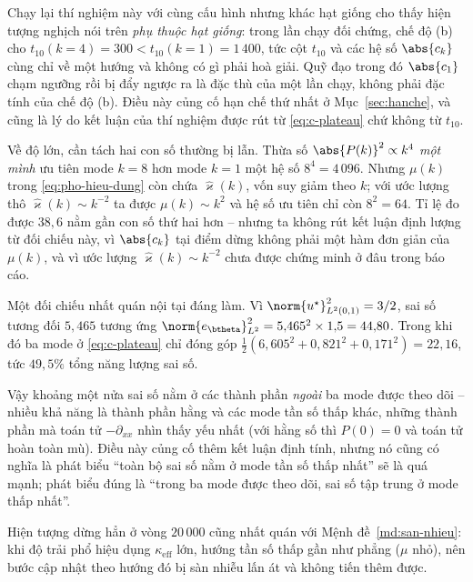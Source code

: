 Chạy lại thí nghiệm này với cùng cấu hình nhưng khác hạt giống cho thấy hiện
tượng nghịch nói trên \emph{phụ thuộc hạt giống}: trong lần chạy đối chứng,
chế độ (b) cho $t_{10}(k{=}4) = 300 < t_{10}(k{=}1) = 1\,400$, tức cột $t_{10}$
và các hệ số $\abs{c_k}$ cùng chỉ về một hướng và không có gì phải hoà giải.
Quỹ đạo trong đó $\abs{c_1}$ chạm ngưỡng rồi bị đẩy ngược ra là đặc thù của một
lần chạy, không phải đặc tính của chế độ (b). Điều này củng cố hạn chế thứ nhất
ở Mục~\ref{sec:hanche}, và cũng là lý do kết luận của thí nghiệm được rút từ
\eqref{eq:c-plateau} chứ không từ $t_{10}$.
 
Về độ lớn, cần tách hai con số thường bị lẫn. Thừa số $\abs{P(k)}^2 \propto k^4$
\emph{một mình} ưu tiên mode $k=8$ hơn mode $k=1$ một hệ số $8^4 = 4\,096$. Nhưng
$\mu(k)$ trong \eqref{eq:pho-hieu-dung} còn chứa $\widehat{\varkappa}(k)$, vốn suy
giảm theo $k$; với ước lượng thô $\widehat{\varkappa}(k)\sim k^{-2}$ ta được
$\mu(k) \sim k^{2}$ và hệ số ưu tiên chỉ còn $8^2 = 64$. Tỉ lệ đo được $38{,}6$
nằm gần con số thứ hai hơn -- nhưng ta không rút kết luận định lượng từ đối chiếu
này, vì $\abs{c_k}$ tại điểm dừng không phải một hàm đơn giản của $\mu(k)$, và vì
ước lượng $\widehat{\varkappa}(k)\sim k^{-2}$ chưa được chứng minh ở đâu trong
báo cáo.
 
\begin{nhanxet}
\label{nx:nang-luong}
Một đối chiếu nhất quán nội tại đáng làm. Vì
$\norm{u^{\star}}^2_{L^2(0,1)} = 3/2$, sai số tương đối $5{,}465$ tương ứng
$\norm{e_{\btheta}}^2_{L^2} = 5{,}465^2\times 1{,}5 = 44{,}80$. Trong khi đó ba
mode ở \eqref{eq:c-plateau} chỉ đóng góp
$\tfrac12(6{,}605^2 + 0{,}821^2 + 0{,}171^2) = 22{,}16$, tức $49{,}5\%$ tổng năng
lượng sai số.
 
Vậy khoảng một nửa sai số nằm ở các thành phần \emph{ngoài} ba mode được theo dõi
-- nhiều khả năng là thành phần hằng và các mode tần số thấp khác, những thành
phần mà toán tử $-\partial_{xx}$ nhìn thấy yếu nhất (với hằng số thì
$P(0) = 0$ và toán tử hoàn toàn mù). Điều này củng cố thêm kết luận định tính,
nhưng nó cũng có nghĩa là phát biểu ``toàn bộ sai số nằm ở mode tần số thấp nhất''
sẽ là quá mạnh; phát biểu đúng là ``trong ba mode được theo dõi, sai số tập trung
ở mode thấp nhất''.
\end{nhanxet}
 
Hiện tượng dừng hẳn ở vòng $20\,000$ cũng nhất quán với
Mệnh đề~\ref{md:san-nhieu}: khi độ trải phổ hiệu dụng $\kappa_{\mathrm{eff}}$ lớn,
hướng tần số thấp gần như phẳng ($\mu$ nhỏ), nên bước cập nhật theo hướng đó bị
sàn nhiễu lấn át và không tiến thêm được.
 

